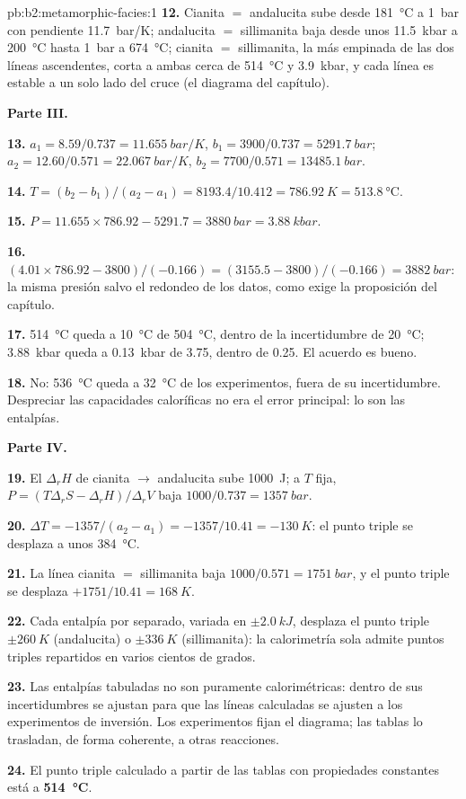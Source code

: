 \begin{solution}{pb:b2:metamorphic-facies:1}
\textbf{12.} Cianita $=$ andalucita sube desde \qty{181}{\celsius} a \qty{1}{bar} con
pendiente \qty{11.7}{bar/K}; andalucita $=$ sillimanita baja desde unos \qty{11.5}{kbar} a
\qty{200}{\celsius} hasta \qty{1}{bar} a \qty{674}{\celsius}; cianita $=$ sillimanita, la
más empinada de las dos líneas ascendentes, corta a ambas cerca de \qty{514}{\celsius} y \qty{3.9}{kbar}, y cada línea es estable a
un solo lado del cruce (el diagrama del capítulo).

\noindent\textbf{Parte III.}

\textbf{13.} $a_1 = 8.59/0.737 = \qty{11.655}{bar/K}$, $b_1 = 3900/0.737 =
\qty{5291.7}{bar}$; $a_2 = 12.60/0.571 = \qty{22.067}{bar/K}$, $b_2 = 7700/0.571 =
\qty{13485.1}{bar}$.

\textbf{14.} $T = (b_2 - b_1)/(a_2 - a_1) = 8193.4/10.412 = \qty{786.92}{K} =
\qty{513.8}{\celsius}$.

\textbf{15.} $P = 11.655\times786.92 - 5291.7 = \qty{3880}{bar} = \qty{3.88}{kbar}$.

\textbf{16.} $(4.01\times786.92 - 3800)/(-0.166) = (3155.5 - 3800)/(-0.166) =
\qty{3882}{bar}$: la misma presión salvo el redondeo de los datos, como exige la proposición del capítulo.

\textbf{17.} \qty{514}{\celsius} queda a \qty{10}{\celsius} de \qty{504}{\celsius}, dentro de
la incertidumbre de \qty{20}{\celsius}; \qty{3.88}{kbar} queda a \qty{0.13}{kbar} de 3.75,
dentro de 0.25. El acuerdo es bueno.

\textbf{18.} No: \qty{536}{\celsius} queda a \qty{32}{\celsius} de los experimentos, fuera de su
incertidumbre. Despreciar las capacidades caloríficas no era el error principal: lo son las entalpías.

\noindent\textbf{Parte IV.}

\textbf{19.} El $\Delta_r H$ de cianita $\to$ andalucita sube \qty{1000}{J}; a
$T$ fija, $P = (T\Delta_r S - \Delta_r H)/\Delta_r V$ baja $1000/0.737 = \qty{1357}{bar}$.

\textbf{20.} $\Delta T = -1357/(a_2 - a_1) = -1357/10.41 = \qty{-130}{K}$: el punto triple
se desplaza a unos \qty{384}{\celsius}.

\textbf{21.} La línea cianita $=$ sillimanita baja $1000/0.571 = \qty{1751}{bar}$, y
el punto triple se desplaza $+1751/10.41 = \qty{+168}{K}$.

\textbf{22.} Cada entalpía por separado, variada en $\pm\qty{2.0}{kJ}$, desplaza el punto triple
$\pm\qty{260}{K}$ (andalucita) o $\pm\qty{336}{K}$ (sillimanita): la calorimetría sola admite
puntos triples repartidos en varios cientos de grados.

\textbf{23.} Las entalpías tabuladas no son puramente calorimétricas: dentro de sus
incertidumbres se ajustan para que las líneas calculadas se ajusten a los experimentos de inversión.
Los experimentos fijan el diagrama; las tablas lo trasladan, de forma coherente, a otras reacciones.

\textbf{24.} El punto triple calculado a partir de las tablas con propiedades constantes está a
\textbf{\qty[text-series-to-math=true]{514}{\celsius}}.
\end{solution}
